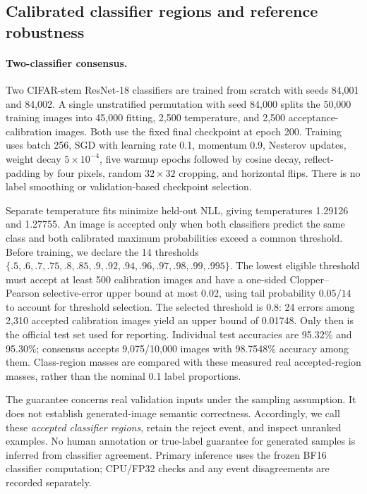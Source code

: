 \subsection{Calibrated classifier regions and reference robustness}
\paragraph{Two-classifier consensus.}
Two CIFAR-stem ResNet-18 classifiers are trained from scratch with seeds
84,001 and 84,002. A single unstratified permutation with seed 84,000
splits the 50,000 training images into 45,000 fitting, 2,500 temperature,
and 2,500 acceptance-calibration images. Both use the fixed final
checkpoint at epoch 200. Training uses batch 256, SGD with learning rate
0.1, momentum 0.9, Nesterov updates, weight decay $5\times10^{-4}$,
five warmup epochs followed by cosine decay, reflect-padding by four
pixels, random $32\times32$ cropping, and horizontal flips.
There is no label smoothing or validation-based checkpoint selection.

Separate temperature fits minimize held-out NLL, giving temperatures
1.29126 and 1.27755. An image is accepted only when both classifiers
predict the same class and both calibrated maximum probabilities exceed
a common threshold. Before training, we declare the 14 thresholds
$\{.5,.6,.7,.75,.8,.85,.9,.92,.94,.96,.97,.98,.99,.995\}$.
The lowest eligible threshold must accept at least 500 calibration images
and have a one-sided Clopper--Pearson selective-error upper bound at most
0.02, using tail probability $0.05/14$ to account for threshold selection.
The selected threshold is 0.8: 24 errors among 2,310 accepted calibration
images yield an upper bound of 0.01748. Only then is the official test set
used for reporting. Individual test accuracies are 95.32\% and 95.30\%;
consensus accepts 9,075/10,000 images with 98.7548\% accuracy among them.
Class-region masses are compared with these measured real accepted-region
masses, rather than the nominal 0.1 label proportions.

The guarantee concerns real validation inputs under the sampling
assumption. It does not establish generated-image semantic correctness.
Accordingly, we call these \emph{accepted classifier regions}, retain the
reject event, and inspect unranked examples. No human annotation or
true-label guarantee for generated samples is inferred from classifier
agreement. Primary inference uses the frozen BF16 classifier computation;
CPU/FP32 checks and any event disagreements are recorded separately.

